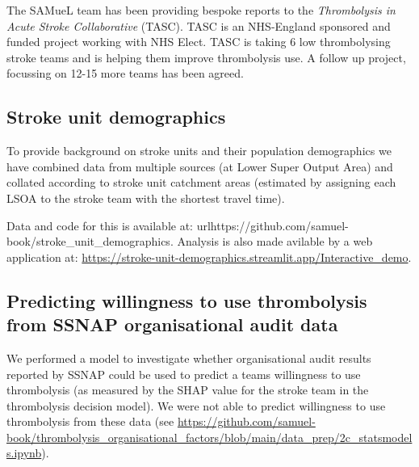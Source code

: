 The SAMueL team has been providing bespoke reports to the \textit{Thrombolysis in Acute Stroke Collaborative} (TASC). TASC is an NHS-England sponsored and funded project working with NHS Elect. TASC is taking 6 low thrombolysing stroke teams and is helping them improve thrombolysis use. A follow up project, focussing on 12-15 more teams has been agreed.

\subsection{Stroke unit demographics}

To provide background on stroke units and their population demographics we have combined data from multiple sources (at Lower Super Output Area) and collated according to stroke unit catchment areas (estimated by assigning each LSOA to the stroke team with the shortest travel time).

Data and code for this is available at: url{https://github.com/samuel-book/stroke_unit_demographics}. Analysis is also made avilable by a web application at: \url{https://stroke-unit-demographics.streamlit.app/Interactive_demo}.

\subsection{Predicting willingness to use thrombolysis from SSNAP organisational audit data}

We performed a model to investigate whether organisational audit results reported by SSNAP could be used to predict a teams willingness to use thrombolysis (as measured by the SHAP value for the stroke team in the thrombolysis decision model). We were not able to predict willingness to use thrombolysis from these data (see \url{https://github.com/samuel-book/thrombolysis_organisational_factors/blob/main/data_prep/2c_statsmodels.ipynb}).